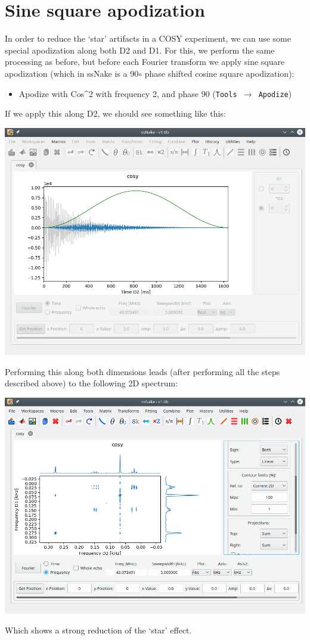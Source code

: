 \documentclass[11pt,a4paper]{article}
\begin{document}
\section{Sine square apodization}
In order to reduce the `star' artifacts in a COSY experiment, we can use some special apodization along both D2 and D1.
For this, we perform the same processing as before, but before each Fourier transform we apply sine square apodization (which in ssNake is a 90$\circ$ phase shifted cosine square apodization):
\begin{itemize}
  \item Apodize with Cos\^{}2 with frequency 2, and phase 90 (\texttt{Tools $\longrightarrow$ Apodize})
\end{itemize}
If we apply this along D2, we should see something like this:
\begin{center}
\includegraphics[width=0.8\linewidth]{Figs/Fig6.png}
\end{center}
Performing this along both dimensions leads (after performing all the steps described above) to the
following 2D spectrum:
\begin{center}
\includegraphics[width=0.8\linewidth]{Figs/Fig7.png}
\end{center}
Which shows a strong reduction of the `star' effect.
\end{document}
